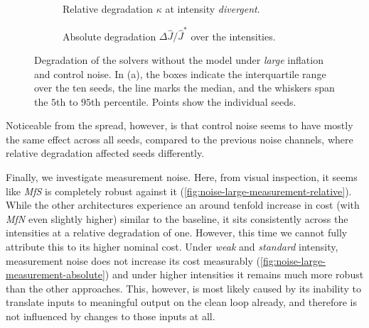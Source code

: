 \begin{figure}[htbp]
  \centering
  \begin{subfigure}[t]{0.49\linewidth}
    \centering
    \caption{Relative degradation $\kappa$ at intensity \emph{divergent}.}
    \label{fig:noise-large-control-divergent}
  \end{subfigure}\hfill
  \begin{subfigure}[t]{0.49\linewidth}
    \centering
    \caption{Absolute degradation $\Delta \hat{J} / \hat{J}^{*}$ over the intensities.}
    \label{fig:noise-large-control-absolute}
  \end{subfigure}
  \caption{Degradation of the solvers without the model under \emph{large} inflation and control noise. In (a), the
  boxes indicate the interquartile range over the ten seeds, the line marks the median, and the whiskers span the $5$th to
  $95$th percentile. Points show the individual seeds.}
  \label{fig:noise-large-control}
\end{figure}

Noticeable from the spread, however, is that control noise seems to have mostly the same effect
across all seeds, compared to the previous noise channels, where relative degradation affected
seeds differently.

Finally, we investigate measurement noise. Here, from visual inspection, it seems like \emph{MfS} is
completely robust against it (\cref{fig:noise-large-measurement-relative}). While the other architectures experience an
around tenfold increase in cost (with \emph{MfN} even slightly higher) similar to the baseline, it sits consistently across
the intensities at a relative degradation of one. However, this time we cannot fully attribute this to
its higher nominal cost. Under \emph{weak} and \emph{standard} intensity, measurement noise does not increase its cost
measurably (\cref{fig:noise-large-measurement-absolute}) and under higher intensities it remains much
more robust than the other approaches. This, however, is most likely caused by its inability to translate inputs
to meaningful output on the clean loop already, and therefore is not influenced by changes to those inputs at all.


